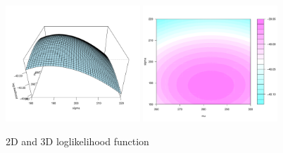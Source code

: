\documentclass[10pt]{beamer}
\begin{document}
\begin{frame}[allowframebreaks]
\begin{itemize}








    \newpage
    \begin{figure}
      \includegraphics[width=0.45\textwidth]{3dlike}
      \includegraphics[width=0.45\textwidth]{2dlike}
      \caption{2D and 3D loglikelihood function}
    \end{figure}


  \end{itemize}

\end{frame}
\end{document}
